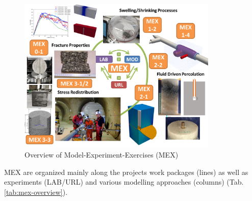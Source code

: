 \begin{figure}[!ht]
\centering
\includegraphics[width=0.85\textwidth]{figures/geomint-mex-overview.png}
\caption{Overview of Model-Experiment-Exercises (MEX)}
\label{fig:mex-overview}
\end{figure}

MEX are organized mainly along the projects work packages (lines) as well as experiments (LAB/URL) and various modelling approaches (columns) (Tab. \ref{tab:mex-overview}).

